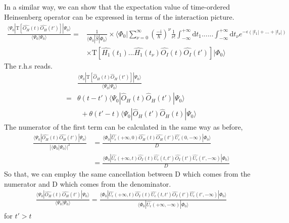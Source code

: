 ﻿\documentclass[twoside]{book}
\numberwithin{equation}{section}
\begin{document}
In a similar way, we can show that  the expectation value of time-ordered Heinsenberg operator can be expressed in terms of the interaction picture.
\begin{align}\label{2.4.3}
\frac{\langle\Psi_0|\mathrm{T}[\hat{O_H}(t)\hat{O_H}(t')]|\Psi_0\rangle}{\langle\Psi_0|\Psi_0\rangle}=&\frac{1}{\langle\Phi_0|\hat{S}|\Phi_0\rangle}\times\langle\Phi_0|\sum_{\nu=0}^{\infty}(\frac{-\mathrm{i}}{\hbar})^{\nu} \frac{1}{\nu!} \int_{-\infty}^{+\infty}\mathrm{d}t_1......\int_{-\infty}^{+\infty}\mathrm{d}t_{\nu}e^{-\epsilon(|t_1|+...+|t_{\nu}|)} \nonumber\\
&\times \mathrm{T}[\hat{H_1}(t_1)...\hat{H_1}(t_{\nu})\hat{O_I}(t)\hat{O_I}(t')]|\Phi_0\rangle
\end{align}
The r.h.s reads.
\begin{align}
&\frac{\langle\Psi_0|\mathrm{T}[\hat O_{H}(t)\hat O_H (t')]|\Psi_0\rangle}{\langle\Psi_0|\Psi_0\rangle} \nonumber \\
=&\theta(t-t')\langle\Psi_0|\hat O_{H}(t)\hat O_H (t')|\Psi_0\rangle \nonumber \\
& \ \ +\theta(t'-t)\langle\Psi_0|\hat O_{H}(t')\hat O_H (t)|\Psi_0\rangle \nonumber 
\end{align}
The numerator of the first term can be calculated in the same way as before,
\begin{align}
\frac{\langle\Psi_0|\hat{O_H}(t)\hat{O_H}(t')|\Psi_0\rangle}{|\langle\Phi_0|\Psi_0\rangle|^2}&=\frac{\langle\Phi_0|\hat{U_{\epsilon}}(+\infty,0)\hat{O_H}(t)\hat{O_H}(t')\hat{U_{\epsilon}}(0,-\infty)|\Phi_0\rangle}{D} \nonumber \\
&=\frac{\langle\Phi_0|\hat{U_{\epsilon}}(+\infty,t)\hat{O_I}(t)\hat{U_{\epsilon}}(t,t')\hat{O_I}(t')\hat{U_{\epsilon}}(t',-\infty)|\Phi_0\rangle}{D} \nonumber
\end{align}
So that, we can employ the same cancellation between D which comes from the numerator and D which comes from the denominator.
\begin{align}
\frac{\langle\Psi_0|\hat{O_H}(t)\hat{O_H}(t')|\Psi_0\rangle}{\langle\Psi_0|\Psi_0\rangle}=\frac{\langle\Phi_0|\hat{U_{\epsilon}}(+\infty,t)\hat{O_I}(t)\hat{U_{\epsilon}}(t,t')\hat{O_I}(t')\hat{U_{\epsilon}}(t',-\infty)|\Phi_0\rangle}{\langle\Phi_0|\hat{U_{\epsilon}}(+\infty,-\infty)|\Phi_0\rangle}\nonumber
\end{align}
for $t'>t$
\end{document}
